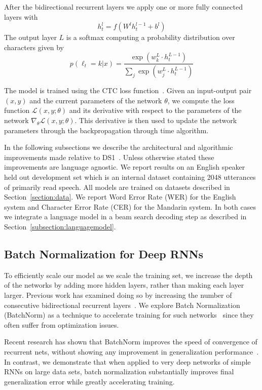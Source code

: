 \documentclass{article}
\begin{document}
After the bidirectional recurrent layers we apply one or more fully connected layers with
\begin{equation}
    h^l_t = f( W^l h^{l-1}_t + b^l )
\end{equation}
The output layer $L$ is a softmax computing a probability distribution over characters given by
\begin{equation}
    p(\ell_t=k | x) = \frac{\exp(w^L_k \cdot h^{L-1}_t)}{\sum_j \exp(w^L_j \cdot h^{L-1}_t)}
\end{equation}

The model is trained using the CTC loss function~\cite{graves2006}. Given an input-output pair $(x, y)$ and the current parameters of the network $\theta$, we compute the loss function $\mathcal{L}(x, y; \theta)$ and its derivative with respect to the parameters of the network $\nabla_\theta \mathcal{L}(x, y; \theta)$. This derivative is then used to update the network parameters through the backpropagation through time algorithm.

In the following subsections we describe the architectural and algorithmic improvements made relative to DS1~\cite{hannun2014deepspeech}.  Unless otherwise stated these improvements are language agnostic. We report results on an English speaker held out development set which is an internal dataset containing 2048 utterances of primarily read speech. All models are trained on datasets described in Section~\ref{section:data}. We report Word Error Rate (WER) for the English system and Character Error Rate (CER) for the Mandarin system. In both cases we integrate a language model in a beam search decoding step as described in Section~\ref{subsection:languagemodel}.


\subsection{Batch Normalization for Deep RNNs}
\label{subsection:depth}

To efficiently scale our model as we scale the training set, we increase the depth of the networks by adding more hidden layers, rather than making each layer larger. Previous work has examined doing so by increasing the number of consecutive bidirectional recurrent layers~\cite{graves2013drnn}. We explore Batch Normalization (BatchNorm) as a technique to accelerate training for such networks~\cite{ioffe2015} since they often suffer from optimization issues. 

Recent research has shown that BatchNorm improves the speed of convergence of recurrent nets, without showing any improvement in generalization performance~\cite{laurent2015}. In contrast, we demonstrate that when applied to very deep networks of simple RNNs on large data sets, batch normalization substantially improves final generalization error while greatly accelerating training. 
\end{document}
